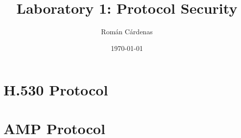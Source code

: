 \documentclass[12pt]{article}
\title{Laboratory 1: Protocol Security}					%
\author{Román Cárdenas}									%
\date{\today}											%
\begin{document}

\tableofcontents
\listoffigures
\lstlistoflistings
\pagebreak
\section{H.530 Protocol}\label{sec:h530}
	
\section{AMP Protocol}\label{sec:amp}
		
\clearpage
\nocite{*}						  %

\end{document}
